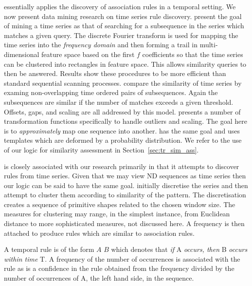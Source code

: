 \cite{sa96} essentially applies the discovery of association rules in a
temporal setting. We now present data mining research on time series
rule discovery. \cite{frm94} present the goal of mining a time series as
that of searching for a subsequence in the series which matches a
given query. The discrete Fourier transform is used for
mapping the time series into the {\em frequency domain} and then forming a
trail in multi-dimensional feature space based on the first $f$
coefficients so that the time series can be clustered into rectangles
in feature space. This allows similarity queries to then be answered. 
Results show these
procedures to be more efficient than standard sequential scanning
processes. \cite{alss95,dgm97,rm97} compare the similarity of time
series by examing non-overlapping time ordered pairs of
subsequences. Again the subsequences are similar if the number of
matches exceeds a given threshold. Offsets, gaps, and scaling are all
addressed by this model. \cite{dgm97} presents a number of
transformation functions specifically to handle outliers and
scaling. The goal here is to {\em approximately} map one sequence into
another. \cite{ks97} has the same goal and uses templates which are
deformed by a probability distribution. We refer to the use of our
logic for similarity assessment in Section~\ref{sec:tr_sim_ass}.

\medskip

\cite{dlm98} is closely associated with our research primarily in that
it attempts to discover rules from time series. Given that we may view ND
sequences as time series then our logic can be said to have the same
goal. \cite{dlm98} initially discretise the series and then attempt to
cluster them according to similarity of the pattern. The
discretisation creates a sequence of primitive shapes related to the
chosen window size. The measures for clustering may range, in the
simplest instance, from Euclidean distance to more sophisticated
measures, not discussed here. A frequency is then attached to produce
rules which are similar to association rules.


\begin{definition}
\begin{rm}
A temporal rule is of the form $A$
 $B$
which denotes that {\em if} A {\em occurs, then} B {\em occurs within
time} T. A 
frequency of the number of occurrences is associated with the rule as
is a confidence in the rule obtained from the frequency divided by the
number of occurrences of A, the left hand side, in the sequence.
\end{rm}
\end{definition}

